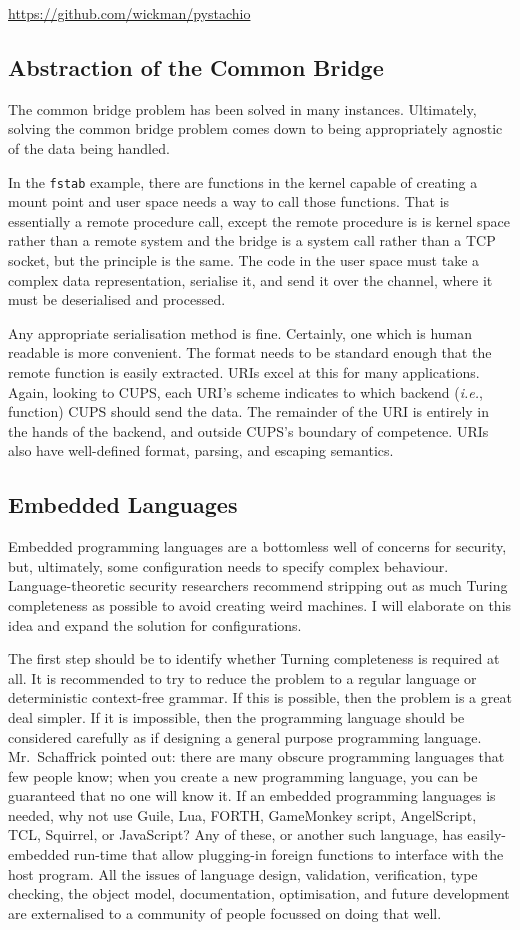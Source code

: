 \documentclass[letterpaper,twocolumn,10pt]{article}
\begin{document}
\noindent \url{https://github.com/wickman/pystachio}

\subsection{Abstraction of the Common Bridge}
The common bridge problem has been solved in many instances. Ultimately, solving the common bridge problem comes down to being appropriately agnostic of the data being handled.

In the \texttt{fstab} example, there are functions in the kernel capable of creating a mount point and user space needs a way to call those functions. That is essentially a remote procedure call, except the remote procedure is is kernel space rather than a remote system and the bridge is a system call rather than a TCP socket, but the principle is the same. The code in the user space must take a complex data representation, serialise it, and send it over the channel, where it must be deserialised and processed.

Any appropriate serialisation method is fine. Certainly, one which is human readable is more convenient. The format needs to be standard enough that the remote function is easily extracted. URIs excel at this for many applications. Again, looking to CUPS, each URI's scheme indicates to which backend (\emph{i.e.}, function) CUPS should send the data. The remainder of the URI is entirely in the hands of the backend, and outside CUPS's boundary of competence. URIs also have well-defined format, parsing, and escaping semantics.

\subsection{Embedded Languages}
Embedded programming languages are a bottomless well of concerns for security, but, ultimately, some configuration needs to specify complex behaviour. Language-theoretic security researchers recommend stripping out as much Turing completeness as possible to avoid creating weird machines. I will elaborate on this idea and expand the solution for configurations.

The first step should be to identify whether Turning completeness is required at all. It is recommended to try to reduce the problem to a regular language or deterministic context-free grammar. If this is possible, then the problem is a great deal simpler. If it is impossible, then the programming language should be considered carefully as if designing a general purpose programming language. Mr.~Schaffrick pointed out: there are many obscure programming languages that few people know; when you create a new programming language, you can be guaranteed that no one will know it. If an embedded programming languages is needed, why not use Guile, Lua, FORTH, GameMonkey script, AngelScript, TCL, Squirrel, or JavaScript? Any of these, or another such language, has easily-embedded run-time that allow plugging-in foreign functions to interface with the host program. All the issues of language design, validation, verification, type checking, the object model, documentation, optimisation, and future development are externalised to a community of people focussed on doing that well.
\end{document}
